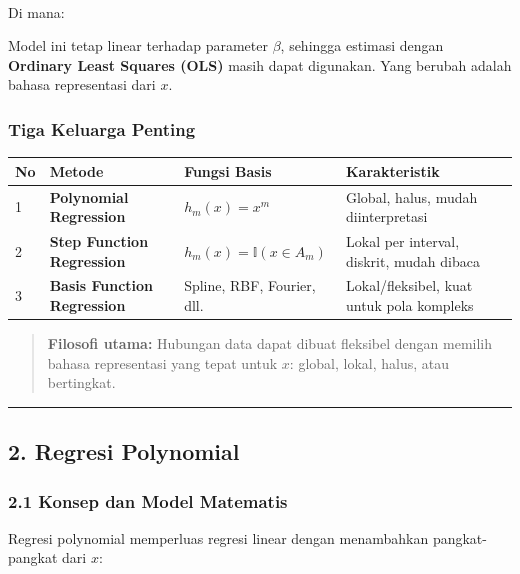 \documentclass[12pt,a4paper]{article}
\begin{document}
\\[
\hat{y}(x) = \beta_0 + \sum_{m=1}^{M} \beta_m h_m(x)
\\]


Di mana:


Model ini tetap linear terhadap parameter $\beta$, sehingga estimasi dengan \textbf{Ordinary Least Squares (OLS)} masih dapat digunakan. Yang berubah adalah bahasa representasi dari $x$.


\subsubsection{Tiga Keluarga Penting}

\begin{tabular}{|l|l|l|l|}
\hline
No & Metode & Fungsi Basis & Karakteristik \\
\hline
1 & \textbf{Polynomial Regression} & $h_m(x) = x^m$ & Global, halus, mudah diinterpretasi \\
\hline
2 & \textbf{Step Function Regression} & $h_m(x) = \mathbb{I}(x \in A_m)$ & Lokal per interval, diskrit, mudah dibaca \\
\hline
3 & \textbf{Basis Function Regression} & Spline, RBF, Fourier, dll. & Lokal/fleksibel, kuat untuk pola kompleks \\
\hline
\end{tabular}


\begin{quote}
\textbf{Filosofi utama:} Hubungan data dapat dibuat fleksibel dengan memilih bahasa representasi yang tepat untuk $x$: global, lokal, halus, atau bertingkat.\end{quote}


\hrule


\subsection{2. Regresi Polynomial}

\subsubsection{2.1 Konsep dan Model Matematis}

Regresi polynomial memperluas regresi linear dengan menambahkan pangkat-pangkat dari $x$:


\\[
\hat{y}(x) = \beta_0 + \beta_1 x + \beta_2 x^2 + \beta_3 x^3 + \dots + \beta_d x^d
\\]
\end{document}
